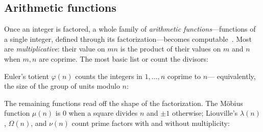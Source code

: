 \subsection{Arithmetic functions}
\label{ssec:nt-arith}

Once an integer is factored, a whole family of \emph{arithmetic
functions}---functions of a single integer, defined through its
factorization---becomes computable~\cite{hardywright}. Most are \emph{multiplicative}: their value on \(mn\) is the product of their values on \(m\) and \(n\) when
\(m,n\) are coprime. The most basic list or count the divisors:

\begin{codepairs}
\end{codepairs}

Euler's totient \(\varphi(n)\) counts the integers in \(1,\dots,n\) coprime to \(n\)---
equivalently, the size of the group of units modulo \(n\):

\begin{codepairs}
\end{codepairs}

The remaining functions read off the shape of the factorization. The M\"obius function
\(\mu(n)\) is \(0\) when a square divides \(n\)
and \(\pm1\) otherwise; Liouville's \(\lambda(n)\), \(\Omega(n)\), and \(\nu(n)\) count
prime factors with and without multiplicity:

